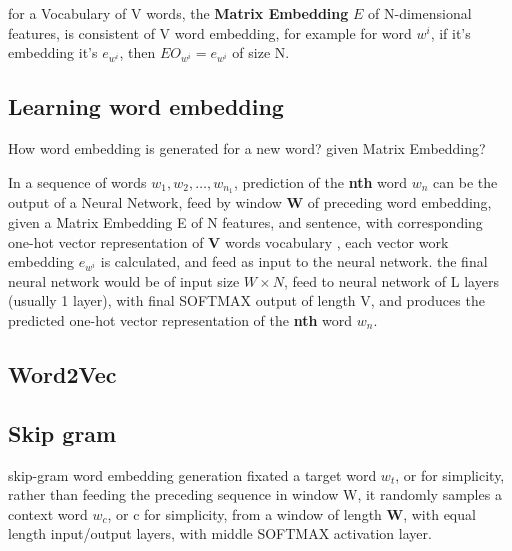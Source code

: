 \documentclass[4apaper,12pt]{book}
\begin{document}
\begin{description}
\begin{description}
\begin{description}
      \end{description}
      \item for a Vocabulary of V words, the \textbf{Matrix Embedding} $E$ of N-dimensional features, is consistent of V word embedding, for example for word $w^i$, if it's embedding it's $e_{w^i}$, then $EO_{w^i}=e_{w^i}$ of size N.
        \subsection{Learning word embedding}
        \begin{description}
        \item How word embedding is generated for a new word? given Matrix Embedding?
        \item In a sequence of words $w_1,w_2,\dots,w_{n_1}$, prediction of the \textbf{nth} word $w_n$ can be the output of a Neural Network, feed by window \textbf{W} of preceding word embedding, given a Matrix Embedding E of N features, and sentence, with corresponding one-hot vector representation of \textbf{V} words vocabulary  , each vector work embedding $e_{w^i}$ is calculated, and feed as input to the neural network. the final neural network would be of input size $W\times{N}$, feed to neural network of L layers (usually 1 layer), with final SOFTMAX output of length V, and produces the predicted one-hot vector representation of the \textbf{nth} word $w_n$.
          \subsection{Word2Vec}
            \subsection{Skip gram}
            \begin{description}
            \item skip-gram word embedding generation fixated a target word $w_t$, or for simplicity, rather than feeding the preceding sequence in window W, it randomly samples a context word $w_c$, or c for simplicity, from a window of length \textbf{W}, with equal length input/output layers, with middle SOFTMAX activation layer.


\end{description}
\end{description}
\end{description}
\end{description}
\end{document}
